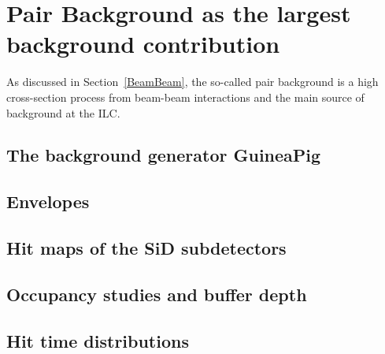 \chapter{\electron \positron Pair Background as the largest background contribution}
\label{PairBkg}
As discussed in Section~\ref{BeamBeam}, the so-called pair background is a high cross-section process from beam-beam interactions and the main source of background at the ILC.


\section{The background generator GuineaPig}
\label{PairBkg:GuineaPig}
\section{Envelopes}
\label{PairBkg:helix}
\section{Hit maps of the SiD subdetectors}
\label{PairBkg:hitmaps}
\section{Occupancy studies and buffer depth}
\label{PairBkg:occupancy}
\section{Hit time distributions}
\label{PairBkg:hittime}



